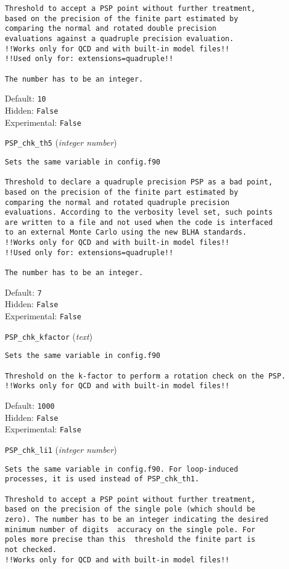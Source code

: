 \begin{basedescript}{\desclabelstyle{\pushlabel}}
\begin{verbatim}
Threshold to accept a PSP point without further treatment,
based on the precision of the finite part estimated by
comparing the normal and rotated double precision
evaluations against a quadruple precision evaluation.
!!Works only for QCD and with built-in model files!!
!!Used only for: extensions=quadruple!!

The number has to be an integer.
\end{verbatim}
Default: \verb|10|
\\Hidden: \verb|False|
\\Experimental: \verb|False|
\\\item[\colorbox{gray!30}{\texttt{PSP\_chk\_th5}}] (\textit{integer number})
\begin{verbatim}
Sets the same variable in config.f90

Threshold to declare a quadruple precision PSP as a bad point,
based on the precision of the finite part estimated by
comparing the normal and rotated quadruple precision
evaluations. According to the verbosity level set, such points
are written to a file and not used when the code is interfaced
to an external Monte Carlo using the new BLHA standards.
!!Works only for QCD and with built-in model files!!
!!Used only for: extensions=quadruple!!

The number has to be an integer.
\end{verbatim}
Default: \verb|7|
\\Hidden: \verb|False|
\\Experimental: \verb|False|
\\\item[\colorbox{gray!30}{\texttt{PSP\_chk\_kfactor}}] (\textit{text})
\begin{verbatim}
Sets the same variable in config.f90

Threshold on the k-factor to perform a rotation check on the PSP.
!!Works only for QCD and with built-in model files!!
\end{verbatim}
Default: \verb|1000|
\\Hidden: \verb|False|
\\Experimental: \verb|False|
\\\item[\colorbox{gray!30}{\texttt{PSP\_chk\_li1}}] (\textit{integer number})
\begin{verbatim}
Sets the same variable in config.f90. For loop-induced
processes, it is used instead of PSP_chk_th1.

Threshold to accept a PSP point without further treatment,
based on the precision of the single pole (which should be
zero). The number has to be an integer indicating the desired
minimum number of digits  accuracy on the single pole. For
poles more precise than this  threshold the finite part is
not checked.
!!Works only for QCD and with built-in model files!!


\end{verbatim}
\end{basedescript}
